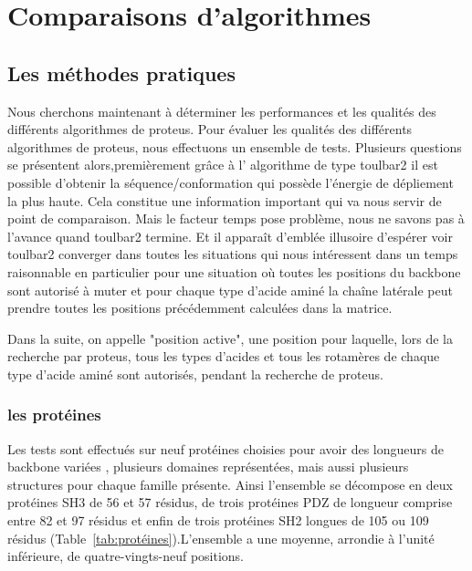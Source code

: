 \chapter{Comparaisons d'algorithmes}
\label{chap:resultats_comparaisons}


\section{Les méthodes pratiques} 
\label{sec:methodes_pratiques}
Nous cherchons maintenant à déterminer les performances et les qualités des différents algorithmes de proteus.
Pour évaluer les qualités des différents algorithmes de proteus, nous effectuons un ensemble de tests. 
Plusieurs questions se présentent alors,premièrement grâce à l' algorithme de type toulbar2 il est possible d'obtenir la séquence/conformation qui possède l'énergie de dépliement la plus haute. Cela constitue une information important qui va nous servir de point de comparaison. Mais le facteur temps pose problème, nous ne savons pas à l'avance quand toulbar2 termine. Et il apparaît d'emblée illusoire d'espérer voir toulbar2 converger dans toutes les situations qui nous intéressent dans un temps raisonnable en particulier pour une situation où  toutes les positions du  backbone sont autorisé à muter et pour chaque type d'acide aminé la chaîne latérale peut prendre toutes les positions précédemment calculées dans la matrice. 


Dans la suite, on appelle "position active", une position pour laquelle, lors de la recherche par proteus, tous les types d'acides et tous les rotamères de chaque type d'acide aminé sont autorisés, pendant la recherche de proteus. 


\subsection{les protéines}
 
Les tests sont effectués sur neuf protéines choisies pour avoir des longueurs de backbone variées , plusieurs domaines représentées, mais aussi plusieurs structures pour chaque famille présente. Ainsi l'ensemble se décompose en deux protéines SH3 de 56 et 57 résidus, de trois protéines PDZ de longueur comprise entre 82 et 97 résidus  et enfin de trois protéines SH2  longues de 105 ou 109 résidus (Table~\ref{tab:protéines}).L'ensemble a une moyenne, arrondie à l'unité inférieure, de quatre-vingts-neuf positions. 
  


